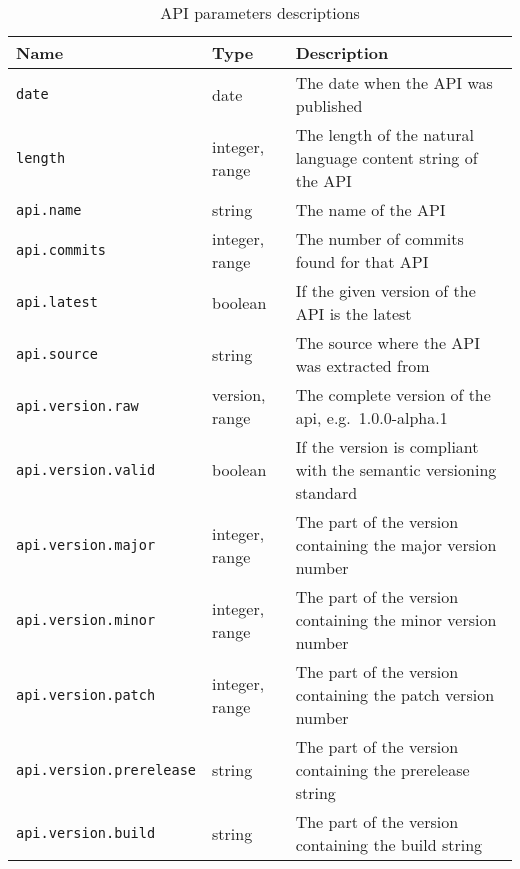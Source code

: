\begin{table}[!h]
    \begin{center}
        \begin{tabular}{l l p{9cm}}
            \hline
            \textbf{Name} & \textbf{Type} & \textbf{Description} \\ \hline
            \verb|date| & date & The date when the API was published \\
            \verb|length| & integer, range & The length of the natural language content string of the API  \\
            \verb|api.name| & string & The name of the API \\
            \verb|api.commits| & integer, range & The number of commits found for that API \\
            \verb|api.latest| & boolean & If the given version of the API is the latest \\
            \verb|api.source| & string & The source where the API was extracted from \\
            \verb|api.version.raw| & version, range & The complete version of the api, e.g.\ 1.0.0-alpha.1 \\
            \verb|api.version.valid| & boolean & If the version is compliant with the semantic versioning standard~\cite{preston-werner_semantic_nodate} \\
            \verb|api.version.major| & integer, range & The part of the version containing the major version number \\
            \verb|api.version.minor| & integer, range & The part of the version containing the minor version number \\
            \verb|api.version.patch| & integer, range & The part of the version containing the patch version number \\
            \verb|api.version.prerelease| & string & The part of the version containing the prerelease string \\
            \verb|api.version.build| & string & The part of the version containing the build string \\ \hline
        \end{tabular}
    \end{center}

    \caption{API parameters descriptions}
    \label{tab:parameters-api}
\end{table}

